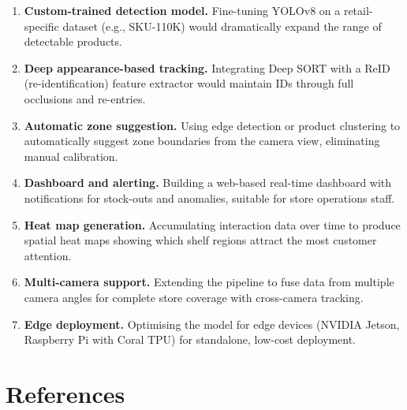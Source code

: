 \documentclass[12pt,a4paper]{article}
\begin{document}
\begin{enumerate}
    \item \textbf{Custom-trained detection model.} Fine-tuning YOLOv8 on a retail-specific dataset (e.g., SKU-110K) would dramatically expand the range of detectable products.

    \item \textbf{Deep appearance-based tracking.} Integrating Deep SORT with a ReID (re-identification) feature extractor would maintain IDs through full occlusions and re-entries.

    \item \textbf{Automatic zone suggestion.} Using edge detection or product clustering to automatically suggest zone boundaries from the camera view, eliminating manual calibration.

    \item \textbf{Dashboard and alerting.} Building a web-based real-time dashboard with notifications for stock-outs and anomalies, suitable for store operations staff.

    \item \textbf{Heat map generation.} Accumulating interaction data over time to produce spatial heat maps showing which shelf regions attract the most customer attention.

    \item \textbf{Multi-camera support.} Extending the pipeline to fuse data from multiple camera angles for complete store coverage with cross-camera tracking.

    \item \textbf{Edge deployment.} Optimising the model for edge devices (NVIDIA Jetson, Raspberry Pi with Coral TPU) for standalone, low-cost deployment.
\end{enumerate}

\section*{References}
\end{document}
